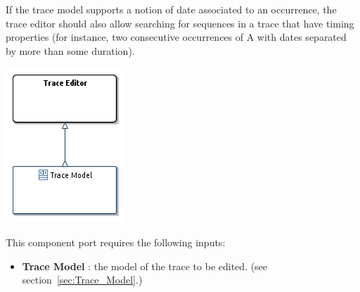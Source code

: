 \documentclass{gemoc} %
\begin{document}
If the trace model supports a notion of date associated to an occurrence, the trace editor should also allow searching for sequences in a trace that have timing properties (for instance, two consecutive occurrences of A with dates separated by more than some duration).
\begin{center}
\includegraphics*[trim=0.0cm 0.0cm 0cm 0.0cm, clip=true]{../images/generated/Generated_Trace_Editor.png}
\end{center}

This component port requires the following inputs:
\begin{itemize}
  \item \textbf{Trace Model} :
the model of the trace to be edited.
(see section~\ref{sec:Trace_Model}.)
\end{itemize}
\end{document}
